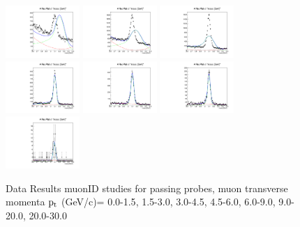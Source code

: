 \documentclass{article}
\begin{document}
\begin{figure}
    \includegraphics[width=0.25\textwidth]{../PlotsRooFitData/croofit_id_pass_0.pdf}
    \includegraphics[width=0.25\textwidth]{../PlotsRooFitData/croofit_id_pass_1.pdf}
    \includegraphics[width=0.25\textwidth]{../PlotsRooFitData/croofit_id_pass_2.pdf}
    \includegraphics[width=0.25\textwidth]{../PlotsRooFitData/croofit_id_pass_3.pdf}
    \includegraphics[width=0.25\textwidth]{../PlotsRooFitData/croofit_id_pass_4.pdf}
    \includegraphics[width=0.25\textwidth]{../PlotsRooFitData/croofit_id_pass_5.pdf}
    \includegraphics[width=0.25\textwidth]{../PlotsRooFitData/croofit_id_pass_6.pdf}
    \caption{Data Results muonID studies for passing probes, muon transverse momenta
    $\rm p_{t}$ (GeV/c)= {0.0-1.5}, {1.5-3.0}, {3.0-4.5}, {4.5-6.0}, 
    {6.0-9.0}, {9.0-20.0}, {20.0-30.0}}
\end{figure}
\end{document}
